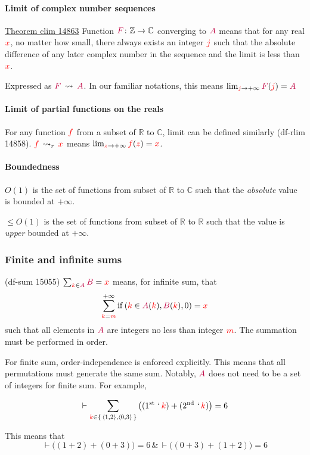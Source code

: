 \documentclass[12pt, letterpaper]{article}
\newcommand{\inte}{\mathbb{Z}}
\newcommand{\re}{\mathbb{R}}
\newcommand{\co}{\mathbb{C}}
\newcommand{\red}[1]{{\color{red} #1}}
\newcommand{\purple}[1]{{\color{purple} #1}}
\newcommand{\provable}{\vdash}
\newcommand{\setvar}{\red}
\newcommand{\classvar}{\purple}
\newcommand{\sff}{\setvar{f}}
\newcommand{\sj}{\setvar{j}}
\newcommand{\sk}{\setvar{k}}
\newcommand{\sm}{\setvar{m}}
\newcommand{\sx}{\setvar{x}}
\newcommand{\sz}{\setvar{z}}
\newcommand{\clA}{\classvar{A}}
\newcommand{\clB}{\classvar{B}}
\newcommand{\clF}{\classvar{F}}
\newcommand{\cif}[3]{\operatorname{if}\left({#1},{#2},{#3}\right)}
\newcommand{\at}{\,`\,}
\newcommand{\clim}{\,\rightsquigarrow\,}
\newcommand{\rlim}{\,\rightsquigarrow_r\,}
\newcommand{\Oone}{O(1)}
\newcommand{\leOone}{\le\!O(1)}
\newcommand{\opair}[2]{\left\langle{{#1},{#2}}\right\rangle}
\newcommand{\fst}{\operatorname{1^{st}}}
\newcommand{\snd}{\operatorname{2^{nd}}}
\theoremstyle{definition}
\theoremstyle{remark}
\theoremstyle{definition}
\theoremstyle{plain}
\begin{document}
	\paragraph{Limit of complex number sequences}
	\href{https://us.metamath.org/mpeuni/clim.html}{Theorem clim 14863} Function $\clF\colon\inte\to\co$ converging to $\clA$ means that for any real $\sx$, no matter how small, there always exists an integer $\sj$ such that the absolute difference of any later complex number in the sequence and the limit is less than $\sx$.
	
	Expressed as $\clF\clim\clA$. In our familiar notations, this means
	$\lim_{\sj\to+\infty}\clF(\sj)=\clA$
	
	\paragraph{Limit of partial functions on the reals}
	For any function $\sff$ from a subset of $\re$ to $\co$, limit can be defined similarly (df-rlim 14858). $\sff\rlim\sx$ means $\lim_{\sz\to+\infty}\sff(\sz)=\sx$.
	
	\paragraph{Boundedness}
	$\Oone$ is the set of functions from subset of $\re$ to $\co$ such that the \textit{absolute} value is bounded at $+\infty$.
	
	$\leOone$ is the set of functions from subset of $\re$ to $\re$ such that the value is \textit{upper} bounded at $+\infty$.
	
	\subsubsection{Finite and infinite sums}
	(df-sum 15055)
	$\sum_{\sk\in\clA}\clB=\sx$ means, for infinite sum, that
	\[\sum_{\sk=\sm}^{+\infty}\cif{\sk\in\clA(\sk)}{\clB(\sk)}{0}=\sx\]
	such that all elements in $\clA$ are integers no less than integer $\sm$. The summation must be performed in order.
	
	For finite sum, order-independence is enforced explicitly. This means that all permutations must generate the same sum. Notably, $\clA$ does not need to be a set of integers for finite sum. For example,
	
	\[\provable
	\sum_{\sk\in\set{\opair{1}{2},\opair{0}{3}}}\big((\fst\at\sk)+(\snd\at\sk)\big)=6
	\]
	
	This means that
	\[
	\provable \big((1+2)+(0+3)\big)=6\,\&\,\provable \big((0+3)+(1+2)\big)=6
	\]
	
\end{document}
